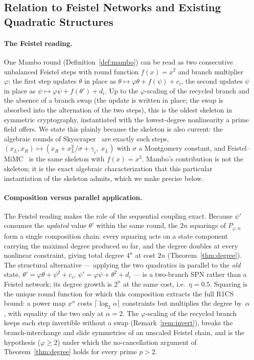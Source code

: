 \documentclass[11pt,a4paper]{article}
\theoremstyle{definition}
\begin{document}
\subsection{Relation to Feistel Networks and Existing Quadratic
Structures}\label{sec:map:feistel}

\paragraph{The Feistel reading.}
One Mambo round (Definition~\ref{def:mambo}) can be read as two
consecutive unbalanced Feistel steps with round function $f(x) = x^2$
and branch multiplier~$\varphi$: the first step updates $\theta$ in
place as $\theta \mapsto \varphi\theta + f(\psi) + c_i$, the second
updates $\psi$ in place as $\psi \mapsto \varphi\psi + f(\theta') +
d_i$. Up to the $\varphi$-scaling of the recycled branch and the
absence of a branch swap (the update is written in place; the swap is
absorbed into the alternation of the two steps), this is the oldest
skeleton in symmetric cryptography, instantiated with the lowest-degree
nonlinearity a prime field offers. We state this plainly because the
skeleton is also current: the algebraic rounds of
Skyscraper~\cite{Skyscraper} are exactly such steps, $(x_L, x_R)
\mapsto (x_R + x_L^2/\sigma + \gamma_i,\; x_L)$ with $\sigma$ a
Montgomery constant, and Feistel--MiMC~\cite{MiMC,Bariant_CICO} is the
same skeleton with $f(x) = x^3$. Mambo's contribution is not the
skeleton; it is the exact algebraic characterization that this
particular instantiation of the skeleton admits, which we make precise
below.

\paragraph{Composition versus parallel application.}
The Feistel reading makes the role of the sequential coupling exact.
Because $\psi'$ consumes the \emph{updated} value $\theta'$ within the
same round, the $2n$ squarings of $P_{\varphi,n}$ form a single
composition chain: every squaring acts on a state component carrying
the maximal degree produced so far, and the degree doubles at every
nonlinear constraint, giving total degree $4^n$ at cost $2n$
(Theorem~\ref{thm:degree}). The structural alternative --- applying the
two quadratics in parallel to the \emph{old} state, $\theta' =
\varphi\theta + \psi^2 + c_i$, $\psi' = \varphi\psi + \theta^2 + d_i$
--- is a two-branch SPN rather than a Feistel network; its degree
growth is $2^n$ at the same cost, i.e.\ $\eta = 0.5$. Squaring is the
unique round function for which this composition extracts the full
R1CS bound: a power map $x^{\alpha}$ costs $\lceil \log_2 \alpha
\rceil$ constraints but multiplies the degree by~$\alpha$, with
equality of the two only at $\alpha = 2$. The $\varphi$-scaling of the
recycled branch keeps each step invertible without a swap
(Remark~\ref{rem:invert}), breaks the branch-interchange and slide
symmetries of an unscaled Feistel chain, and is the hypothesis
($\varphi \ge 2$) under which the no-cancellation argument of
Theorem~\ref{thm:degree} holds for every prime $p > 2$.
\end{document}
